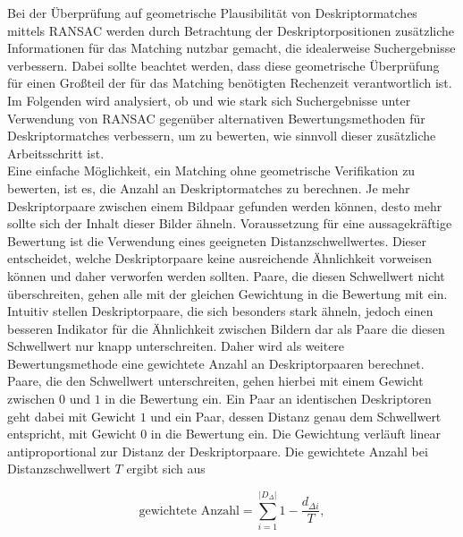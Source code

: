 Bei der Überprüfung auf geometrische Plausibilität von Deskriptormatches mittels RANSAC werden durch Betrachtung der Deskriptorpositionen zusätzliche Informationen für das Matching nutzbar gemacht, die idealerweise Suchergebnisse verbessern. Dabei sollte beachtet werden, dass diese geometrische Überprüfung für einen Großteil der für das Matching benötigten Rechenzeit verantwortlich ist. Im Folgenden wird analysiert, ob und wie stark sich Suchergebnisse unter Verwendung von RANSAC gegenüber alternativen Bewertungsmethoden für Deskriptormatches verbessern, um zu bewerten, wie sinnvoll dieser zusätzliche Arbeitsschritt ist.
\\
Eine einfache Möglichkeit, ein Matching ohne geometrische Verifikation zu bewerten, ist es, die Anzahl an Deskriptormatches zu berechnen. Je mehr Deskriptorpaare zwischen einem Bildpaar gefunden werden können, desto mehr sollte sich der Inhalt dieser Bilder ähneln. Voraussetzung für eine aussagekräftige Bewertung ist die Verwendung eines geeigneten Distanzschwellwertes. Dieser entscheidet, welche Deskriptorpaare keine ausreichende Ähnlichkeit vorweisen können und daher verworfen werden sollten. Paare, die diesen Schwellwert nicht überschreiten, gehen alle mit der gleichen Gewichtung in die Bewertung mit ein. 
\\
Intuitiv stellen Deskriptorpaare, die sich besonders stark ähneln, jedoch einen besseren Indikator für die Ähnlichkeit zwischen Bildern dar als Paare die diesen Schwellwert nur knapp unterschreiten. Daher wird als weitere Bewertungsmethode eine gewichtete Anzahl an Deskriptorpaaren berechnet. Paare, die den Schwellwert unterschreiten, gehen hierbei mit einem Gewicht zwischen $0$ und $1$ in die Bewertung ein. Ein Paar an identischen Deskriptoren geht dabei mit Gewicht $1$ und ein Paar, dessen Distanz genau dem Schwellwert entspricht, mit Gewicht $0$ in die Bewertung ein. Die Gewichtung verläuft linear antiproportional zur Distanz der Deskriptorpaare. Die gewichtete Anzahl bei Distanzschwellwert $T$ ergibt sich aus

\begin{equation}
\text{gewichtete Anzahl} = \sum_{i=1}^{|D_\Delta|}{1 - \frac{d_{\Delta i}}{T}},
\end{equation}

